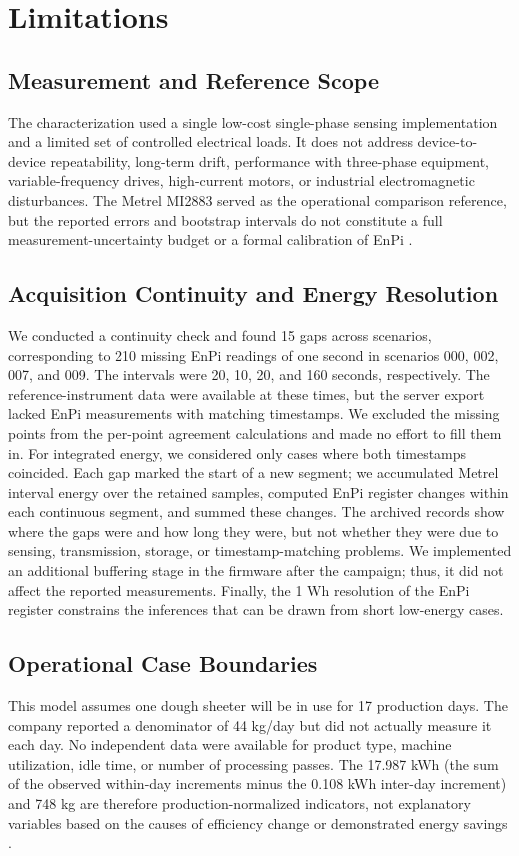 \documentclass[technologies,article,submit,pdftex,moreauthors]{Definitions/mdpi}
\begin{document}
\section{Limitations}
\label{sec:limitations}
\subsection{Measurement and Reference Scope}
The characterization used a single low-cost single-phase sensing implementation and a limited set of controlled electrical loads. It does not address device-to-device repeatability, long-term drift, performance with three-phase equipment, variable-frequency drives, high-current motors, or industrial electromagnetic disturbances. The Metrel MI2883 served as the operational comparison reference, but the reported errors and bootstrap intervals do not constitute a full measurement-uncertainty budget or a formal calibration of EnPi \cite{r2_gum,r2_vim,r2_bland}.

\subsection{Acquisition Continuity and Energy Resolution}
We conducted a continuity check and found 15 gaps across scenarios, corresponding to 210 missing EnPi readings of one second in scenarios 000, 002, 007, and 009. The intervals were 20, 10, 20, and 160 seconds, respectively. The reference-instrument data were available at these times, but the server export lacked EnPi measurements with matching timestamps. We excluded the missing points from the per-point agreement calculations and made no effort to fill them in. For integrated energy, we considered only cases where both timestamps coincided. Each gap marked the start of a new segment; we accumulated Metrel interval energy over the retained samples, computed EnPi register changes within each continuous segment, and summed these changes.
The archived records show where the gaps were and how long they were, but not whether they were due to sensing, transmission, storage, or timestamp-matching problems. We implemented an additional buffering stage in the firmware after the campaign; thus, it did not affect the reported measurements. Finally, the 1 Wh resolution of the EnPi register constrains the inferences that can be drawn from short low-energy cases. 

\subsection{Operational Case Boundaries}
This model assumes one dough sheeter will be in use for 17 production days. The company reported a denominator of 44 kg/day but did not actually measure it each day. No independent data were available for product type, machine utilization, idle time, or number of processing passes. The 17.987 kWh (the sum of the observed within-day increments minus the 0.108 kWh inter-day increment) and 748 kg are therefore production-normalized indicators, not explanatory variables based on the causes of efficiency change or demonstrated energy savings \cite{r2_iso50015}. 
\end{document}
